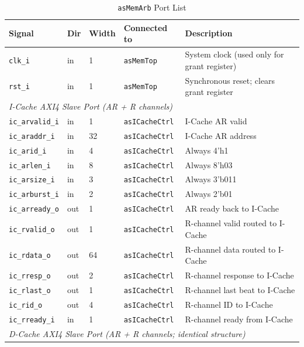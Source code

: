 \begin{table}[H]
\caption{\texttt{asMemArb} Port List}
\label{tab:asMemArbPorts}
\centering
\begin{tabularx}{\textwidth}{|l |l |l |l |X|}
  \hline
  Signal & Dir & Width & Connected to & Description \\
  \hline
  \hline
  \texttt{clk\_i}  & in & 1 & \texttt{asMemTop} & System clock (used only for grant register) \\
  \hline
  \texttt{rst\_i}  & in & 1 & \texttt{asMemTop} & Synchronous reset; clears grant register \\
  \hline
  \multicolumn{5}{|l|}{\textit{I-Cache AXI4 Slave Port (AR + R channels)}} \\
  \hline
  \texttt{ic\_arvalid\_i} & in  & 1  & \texttt{asICacheCtrl} & I-Cache AR valid \\
  \hline
  \texttt{ic\_araddr\_i}  & in  & 32 & \texttt{asICacheCtrl} & I-Cache AR address \\
  \hline
  \texttt{ic\_arid\_i}    & in  & 4  & \texttt{asICacheCtrl} & Always 4'h1 \\
  \hline
  \texttt{ic\_arlen\_i}   & in  & 8  & \texttt{asICacheCtrl} & Always 8'h03 \\
  \hline
  \texttt{ic\_arsize\_i}  & in  & 3  & \texttt{asICacheCtrl} & Always 3'b011 \\
  \hline
  \texttt{ic\_arburst\_i} & in  & 2  & \texttt{asICacheCtrl} & Always 2'b01 \\
  \hline
  \texttt{ic\_arready\_o} & out & 1  & \texttt{asICacheCtrl} & AR ready back to I-Cache \\
  \hline
  \texttt{ic\_rvalid\_o}  & out & 1  & \texttt{asICacheCtrl} & R-channel valid routed to I-Cache \\
  \hline
  \texttt{ic\_rdata\_o}   & out & 64 & \texttt{asICacheCtrl} & R-channel data routed to I-Cache \\
  \hline
  \texttt{ic\_rresp\_o}   & out & 2  & \texttt{asICacheCtrl} & R-channel response to I-Cache \\
  \hline
  \texttt{ic\_rlast\_o}   & out & 1  & \texttt{asICacheCtrl} & R-channel last beat to I-Cache \\
  \hline
  \texttt{ic\_rid\_o}     & out & 4  & \texttt{asICacheCtrl} & R-channel ID to I-Cache \\
  \hline
  \texttt{ic\_rready\_i}  & in  & 1  & \texttt{asICacheCtrl} & R-channel ready from I-Cache \\
  \hline
  \multicolumn{5}{|l|}{\textit{D-Cache AXI4 Slave Port (AR + R channels; identical structure)}} \\

\end{tabularx}
\end{table}
